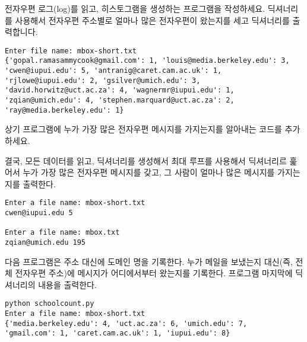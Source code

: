 \begin{ex}
전자우편 로그(log)를 읽고, 히스토그램을 생성하는 프로그램을 작성하세요.
딕셔너리를 사용해서 전자우편 주소별로 얼마나 많은 전자우편이 왔는지를 세고 딕셔너리를 출력합니다.

\beforeverb
\begin{verbatim}
Enter file name: mbox-short.txt
{'gopal.ramasammycook@gmail.com': 1, 'louis@media.berkeley.edu': 3, 
'cwen@iupui.edu': 5, 'antranig@caret.cam.ac.uk': 1, 
'rjlowe@iupui.edu': 2, 'gsilver@umich.edu': 3, 
'david.horwitz@uct.ac.za': 4, 'wagnermr@iupui.edu': 1, 
'zqian@umich.edu': 4, 'stephen.marquard@uct.ac.za': 2, 
'ray@media.berkeley.edu': 1}
\end{verbatim}
\afterverb
\end{ex}

\begin{ex}

상기 프로그램에 누가 가장 많은 전자우편 메시지를 가지는지를 알아내는 코드를 추가하세요.

결국, 모든 데이터를 읽고, 딕셔너리를 생성해서 최대 루프를 사용해서 딕셔너리르 훑어서 누가 가장 많은 전자우편 메시지를 갖고, 그 사람이 얼마나 많은 메시지를 가지는지를 
출력한다.


\beforeverb
\begin{verbatim}
Enter a file name: mbox-short.txt
cwen@iupui.edu 5

Enter a file name: mbox.txt
zqian@umich.edu 195
\end{verbatim}
\afterverb
\end{ex}

\begin{ex}
다음 프로그램은 주소 대신에 도메인 명을 기록한다. 
누가 메일을 보냈는지 대신(즉, 전체 전자우편 주소)에 메시지가 어디에서부터 왔는지를 기록한다.
프로그램 마지막에 딕셔너리의 내용을 출력한다.

\beforeverb
\begin{verbatim}
python schoolcount.py
Enter a file name: mbox-short.txt
{'media.berkeley.edu': 4, 'uct.ac.za': 6, 'umich.edu': 7, 
'gmail.com': 1, 'caret.cam.ac.uk': 1, 'iupui.edu': 8}
\end{verbatim}
\afterverb
\end{ex}

